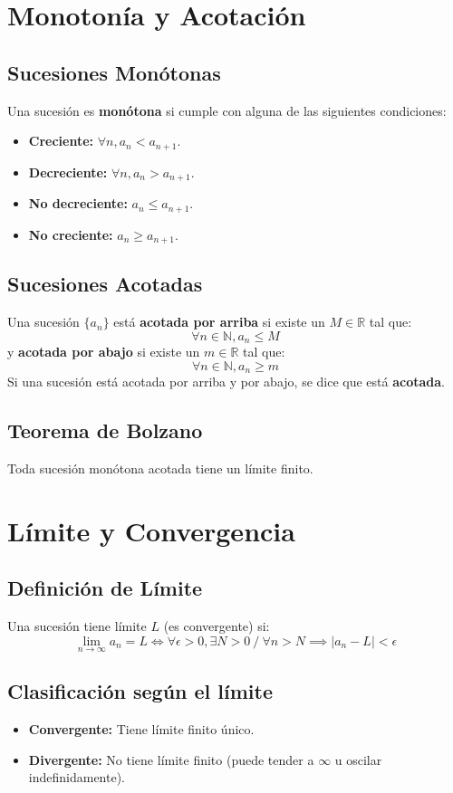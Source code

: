 \documentclass[a4paper,12pt]{article}
\begin{document}
\section{Monotonía y Acotación}

\subsection{Sucesiones Monótonas}
Una sucesión es \textbf{monótona} si cumple con alguna de las siguientes condiciones:
\begin{itemize}
    \item \textbf{Creciente:} $\forall n, a_n < a_{n+1}$.
    \item \textbf{Decreciente:} $\forall n, a_n > a_{n+1}$.
    \item \textbf{No decreciente:} $a_n \le a_{n+1}$.
    \item \textbf{No creciente:} $a_n \ge a_{n+1}$.
\end{itemize}

\subsection{Sucesiones Acotadas}
Una sucesión $\{a_n\}$ está \textbf{acotada por arriba} si existe un $M \in \mathbb{R}$ tal que:
$$ \forall n \in \mathbb{N}, a_n \leqslant M $$
y \textbf{acotada por abajo} si existe un $m \in \mathbb{R}$ tal que:
$$ \forall n \in \mathbb{N}, a_n \geqslant m $$
Si una sucesión está acotada por arriba y por abajo, se dice que está \textbf{acotada}.

\subsection{Teorema de Bolzano}
Toda sucesión monótona acotada tiene un límite finito.

\section{Límite y Convergencia}

\subsection{Definición de Límite}
Una sucesión tiene límite $L$ (es convergente) si:
$$ \lim_{n \to \infty} a_n = L \iff \forall \epsilon > 0, \exists N > 0 \ / \ \forall n > N \implies |a_n - L| < \epsilon $$

\subsection{Clasificación según el límite}
\begin{itemize}
    \item \textbf{Convergente:} Tiene límite finito único.
    \item \textbf{Divergente:} No tiene límite finito (puede tender a $\infty$ u oscilar indefinidamente).
\end{itemize}
\end{document}
